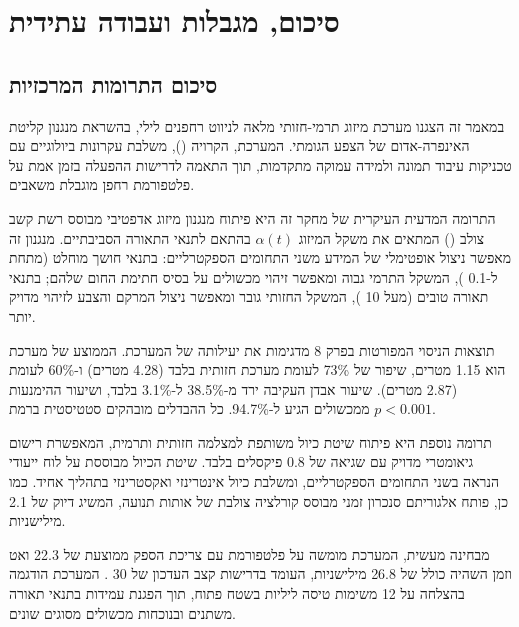 
\section{סיכום, מגבלות ועבודה עתידית}
\label{sec:ch09_conclusion}

\subsection{סיכום התרומות המרכזיות}
\label{sec:ch09_contributions}

במאמר זה הצגנו מערכת מיזוג תרמי-חזותי מלאה לניווט רחפנים לילי, בהשראת מנגנון קליטת האינפרה-אדום של הצפע הגומתי. המערכת, הקרויה  (), משלבת עקרונות ביולוגיים עם טכניקות עיבוד תמונה ולמידה עמוקה מתקדמות, תוך התאמה לדרישות ההפעלה בזמן אמת על פלטפורמת רחפן מוגבלת משאבים.

התרומה המדעית העיקרית של מחקר זה היא פיתוח מנגנון מיזוג אדפטיבי מבוסס רשת קשב צולב () המתאים את משקל המיזוג $\alpha(t)$ בהתאם לתנאי התאורה הסביבתיים. מנגנון זה מאפשר ניצול אופטימלי של המידע משני התחומים הספקטרליים: בתנאי חושך מוחלט (מתחת ל-0.1 ), המשקל התרמי גבוה ומאפשר זיהוי מכשולים על בסיס חתימת החום שלהם; בתנאי תאורה טובים (מעל 10 ), המשקל החזותי גובר ומאפשר ניצול המרקם והצבע לזיהוי מדויק יותר.

תוצאות הניסוי המפורטות בפרק 8 מדגימות את יעילותה של המערכת.  הממוצע של מערכת  הוא 1.15 מטרים, שיפור של 73\% לעומת מערכת  חזותית בלבד (4.28 מטרים) ו-60\% לעומת  (2.87 מטרים). שיעור אבדן העקיבה ירד מ-38.5\% ל-3.1\% בלבד, ושיעור ההימנעות ממכשולים הגיע ל-94.7\%. כל ההבדלים מובהקים סטטיסטית ברמת $p < 0.001$.

תרומה נוספת היא פיתוח שיטת כיול משותפת למצלמה חזותית ותרמית, המאפשרת רישום גיאומטרי מדויק עם שגיאה של 0.8 פיקסלים בלבד. שיטת הכיול מבוססת על לוח ייעודי הנראה בשני התחומים הספקטרליים, ומשלבת כיול אינטרינזי ואקסטרינזי בתהליך אחיד. כמו כן, פותח אלגוריתם סנכרון זמני מבוסס קורלציה צולבת של אותות תנועה, המשיג דיוק של 2.1 מילישניות.

מבחינה מעשית, המערכת מומשה על פלטפורמת  עם צריכת הספק ממוצעת של 22.3 ואט וזמן השהיה כולל של 26.8 מילישניות, העומד בדרישות קצב העדכון של 30 . המערכת הודגמה בהצלחה על 12 משימות טיסה ליליות בשטח פתוח, תוך הפגנת עמידות בתנאי תאורה משתנים ובנוכחות מכשולים מסוגים שונים.

